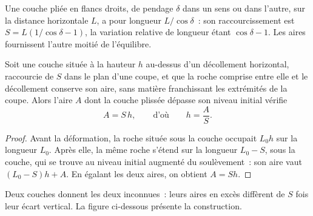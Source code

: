 Une couche pliée en flancs droits, de pendage $\delta$ dans un sens ou dans l'autre, sur la
distance horizontale $L$, a pour longueur $L/\cos\delta$~: son raccourcissement est
$S = L(1/\cos\delta - 1)$, la variation relative de longueur étant $\cos\delta - 1$.
Les aires fournissent l'autre moitié de l'équilibre.

\begin{proposition}\label{prop:b3:structural-analysis:detachment}
Soit une couche située à la hauteur $h$ au-dessus d'un décollement horizontal, raccourcie de $S$
dans le plan d'une coupe, et que la roche comprise entre elle et le décollement
conserve son aire, sans matière franchissant les extrémités de la coupe. Alors l'aire
$A$ dont la couche plissée dépasse son niveau initial vérifie
\[
  A = S\,h , \qquad\text{d'où}\qquad h = \frac AS .
\]
\end{proposition}

\begin{proof}
Avant la déformation, la roche située sous la couche occupait $L_0 h$ sur la
longueur $L_0$. Après elle, la même roche s'étend sur la longueur $L_0 - S$, sous
la couche, qui se trouve au niveau initial augmenté du soulèvement~: son aire vaut
$(L_0 - S)h + A$. En égalant les deux aires, on obtient $A = Sh$.
\end{proof}

Deux couches donnent les deux inconnues~: leurs aires en excès diffèrent de $S$ fois leur
écart vertical. La figure ci-dessous présente la construction.


